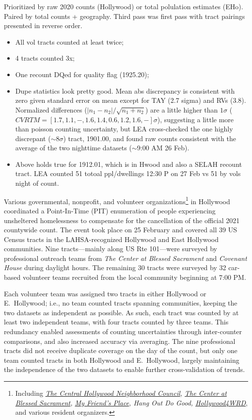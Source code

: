 \documentclass[11pt,twocolumn]{article}
\begin{document}
Prioritized by raw 2020 counts (Hollywood) or total polulation estimates (EHo). 
Paired by total counts + geography. 
Third pass was first pass with tract pairings presented in reverse order.
\begin{itemize}
	\item All vol tracts counted at least twice;
	\item 4 tracts counted 3x;
	\item One recount DQed for quality flag (1925.20);
	\item Dupe statistics look pretty good. Mean abs discrepancy is consistent
		with zero given standard error on mean except for TAY (2.7 sigma) and RVs (3.8).
		Normalized differences ($|n_{1}-n_{2}|/\sqrt{n_{1}+n_{2}}$) are a little higher
		than $1\sigma$ ($CVRTM=[1.7, 1.1, -, 1.6, 1.4, 0.6, 1.2, 1.6, -]\sigma$), suggesting 
		a little more than poisson counting uncertainty, but LEA cross-checked the one
		highly discrepant ($\sim$8$\sigma$) tract, 1901.00, and found raw counts consistent
		with the average of the two nighttime datasets ($\sim$9:00 AM 26 Feb). 
	\item Above holds true for 1912.01, which is in Hwood and also a SELAH recount tract. LEA
		counted 51 totoal ppl/dwellings 12:30 P on 27 Feb vs 51 by vols night of count.
\end{itemize}

Various governmental, nonprofit, and volunteer organizations\footnote{Including
{\it \href{https://chnc.org}{The Central Hollywood Neighborhood Council}, \href{https://thecenterinhollywood.org}{The Center
at Blessed Sacrament}, \href{https://www.myfriendsplace.org/}{My Friend's Place}, Hang Out Do Good, \href{https://hollywood4wrd.live}
{Hollywood4WRD}}, and various resident organizers.} in Hollywood coordinated a Point-In-Time (PIT) 
enumeration of people experiencing unsheltered homelessness to compensate for the cancellation of the 
official 2021 countywide count. The event took place on 25 February and covered all 39 US Census tracts
in the LAHSA-recognized Hollywood and East Hollywood communities. Nine tracts---mainly along US 
Rte 101---were surveyed by professional outreach teams from {\it The Center at Blessed Sacrament} and
{\it Covenant House} during daylight hours. The remaining 30 tracts were surveyed by 32 car-based volunteer
teams recruited from the local community beginning at 7:00 PM.

Each volunteer team was assigned two tracts in either Hollywood or E.~Hollywood; i.e., no team counted
tracts spanning communities, keeping the two datasets as independent as possible. As such, each tract was
counted by at least two independent teams, with four tracts counted by three teams. This redundancy
enabled assessments of counting uncertainties through inter-counter comparisons, and also increased
accuracy via averaging. The nine professional tracts did not receive duplicate coverage on the day of the 
count, but only one team counted tracts in both Hollywood and E.~Hollywood, largely maintaining the
independence of the two datasets to enable further cross-validation of trends.
\end{document}
